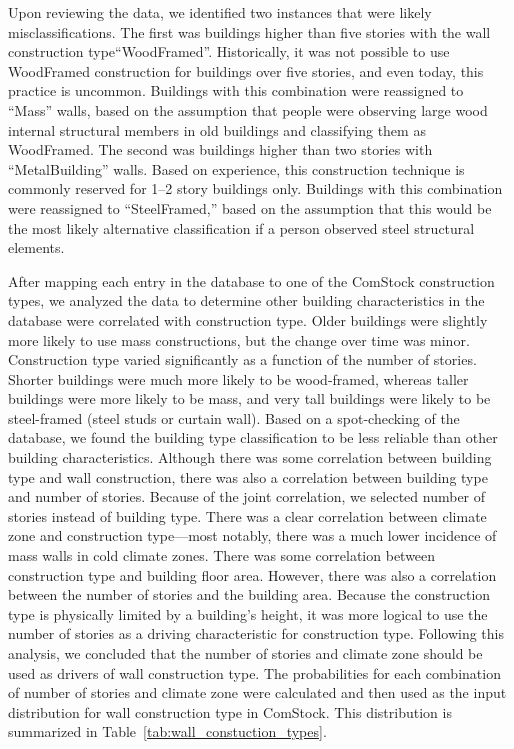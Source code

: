Upon reviewing the data, we identified two instances that were likely misclassifications. The first was buildings higher than five stories with the wall construction type``WoodFramed''. Historically, it was not possible to use WoodFramed construction for buildings over five stories, and even today, this practice is uncommon. Buildings with this combination were reassigned to ``Mass'' walls, based on the assumption that people were observing large wood internal structural members in old buildings and classifying them as WoodFramed. The second was buildings higher than two stories with ``MetalBuilding'' walls. Based on experience, this construction technique is commonly reserved for 1--2 story buildings only. Buildings with this combination were reassigned to ``SteelFramed,'' based on the assumption that this would be the most likely alternative classification if a person observed steel structural elements.

After mapping each entry in the database to one of the ComStock construction types, we analyzed the data to determine other building characteristics in the database were correlated with construction type. Older buildings were slightly more likely to use mass constructions, but the change over time was minor. Construction type varied significantly as a function of the number of stories. Shorter buildings were much more likely to be wood-framed, whereas taller buildings were more likely to be mass, and very tall buildings were likely to be steel-framed (steel studs or curtain wall). Based on a spot-checking of the database, we found the building type classification to be less reliable than other building characteristics. Although there was some correlation between building type and wall construction, there was also a correlation between building type and number of stories. Because of the joint correlation, we selected number of stories instead of building type. There was a clear correlation between climate zone and construction type---most notably, there was a much lower incidence of mass walls in cold climate zones. There was some correlation between construction type and building floor area. However, there was also a correlation between the number of stories and the building area. Because the construction type is physically limited by a building's height, it was more logical to use the number of stories as a driving characteristic for construction type. Following this analysis, we concluded that the number of stories and climate zone should be used as drivers of wall construction type. The probabilities for each combination of number of stories and climate zone were calculated  and then used as the input distribution for wall construction type in ComStock. This distribution is summarized in Table~\ref{tab:wall_constuction_types}.

